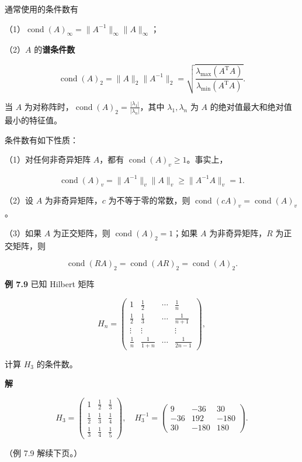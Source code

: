 \documentclass[
  10pt,
  fontset=fandol]{ctexart}
\begin{document}
通常使用的条件数有

（1）\(\operatorname{cond}(A)_\infty=\|A^{-1}\|_\infty\|A\|_\infty\)；

（2）\(A\) 的\textbf{谱条件数}

\[
\operatorname{cond}(A)_2=\|A\|_2\|A^{-1}\|_2
=\sqrt{\frac{\lambda_{\max}(A^{\mathrm T}A)}{\lambda_{\min}(A^{\mathrm T}A)}}.
\]

当 \(A\)
为对称阵时，\(\operatorname{cond}(A)_2=\frac{|\lambda_1|}{|\lambda_n|}\)，其中
\(\lambda_1,\lambda_n\) 为 \(A\) 的绝对值最大和绝对值最小的特征值。

条件数有如下性质：

（1）对任何非奇异矩阵 \(A\)，都有
\(\operatorname{cond}(A)_v\geqslant1\)。事实上，

\[
\operatorname{cond}(A)_v=\|A^{-1}\|_v\|A\|_v\geqslant\|A^{-1}A\|_v=1.
\]

（2）设 \(A\) 为非奇异矩阵，\(c\) 为不等于零的常数，则
\(\operatorname{cond}(cA)_v=\operatorname{cond}(A)_v\)。

（3）如果 \(A\) 为正交矩阵，则 \(\operatorname{cond}(A)_2=1\)；如果
\(A\) 为非奇异矩阵，\(R\) 为正交矩阵，则

\[
\operatorname{cond}(RA)_2=\operatorname{cond}(AR)_2=\operatorname{cond}(A)_2.
\]

\textbf{例 7.9} 已知 Hilbert 矩阵

\[
H_n=\begin{pmatrix}
1&\frac12&\cdots&\frac1n\\[4pt]
\frac12&\frac13&\cdots&\frac1{n+1}\\
\vdots&\vdots&&\vdots\\
\frac1n&\frac1{1+n}&\cdots&\frac1{2n-1}
\end{pmatrix},
\]

计算 \(H_3\) 的条件数。

\textbf{解}

\[
H_3=\begin{pmatrix}
1&\frac12&\frac13\\[4pt]
\frac12&\frac13&\frac14\\[4pt]
\frac13&\frac14&\frac15
\end{pmatrix},\quad
H_3^{-1}=\begin{pmatrix}
9&-36&30\\
-36&192&-180\\
30&-180&180
\end{pmatrix}.
\]

（例 7.9 解续下页。）

\clearpage
\end{document}
